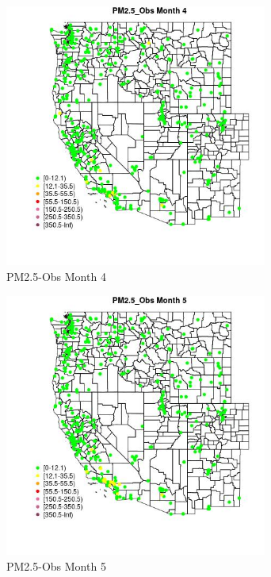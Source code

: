 \begin{figure} 
\centering  
\includegraphics[width=0.77\textwidth]{Code_Outputs/ML_input_report_ML_input_PM25_Step5_part_d_de_duplicated_aves_ML_input_MapObsMo4PM25_Obs.jpg} 
\caption{\label{fig:ML_input_report_ML_input_PM25_Step5_part_d_de_duplicated_aves_ML_inputMapObsMo4PM25_Obs}PM2.5-Obs Month 4} 
\end{figure} 
 

\begin{figure} 
\centering  
\includegraphics[width=0.77\textwidth]{Code_Outputs/ML_input_report_ML_input_PM25_Step5_part_d_de_duplicated_aves_ML_input_MapObsMo5PM25_Obs.jpg} 
\caption{\label{fig:ML_input_report_ML_input_PM25_Step5_part_d_de_duplicated_aves_ML_inputMapObsMo5PM25_Obs}PM2.5-Obs Month 5} 
\end{figure} 
 


